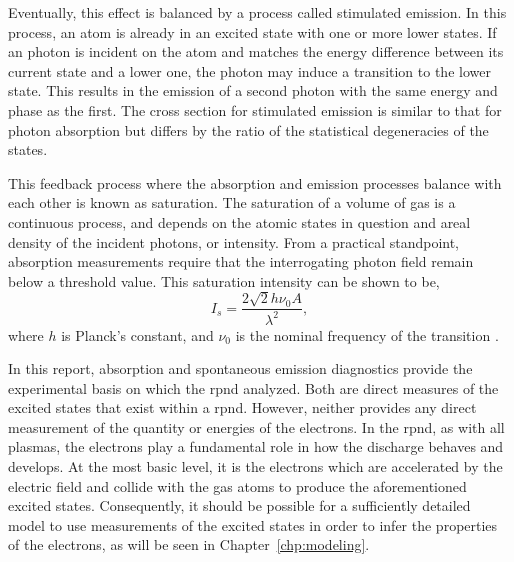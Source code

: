 Eventually, this effect is balanced by a process called stimulated emission. In
this process, an atom is already in an excited state with one or more lower
states. If an photon is incident on the atom and matches the energy difference
between its current state and a lower one, the photon may induce a transition to
the lower state. This results in the emission of a second photon with the same
energy and phase as the first. The cross section for stimulated emission is
similar to that for photon absorption but differs by the ratio of the
statistical degeneracies of the states.

This feedback process where the absorption and emission processes balance with
each other is known as saturation. The saturation of a volume of gas is a
continuous process, and depends on the atomic states in question and areal
density of the incident photons, or intensity. From a practical standpoint,
absorption measurements require that the interrogating photon field remain below
a threshold value. This saturation intensity can be shown \cite{Siegman1986} to
be,
\begin{equation}
  I_s = \frac{2\sqrt{2}h\nu_0A}{\lambda^2},
\end{equation}
where $h$ is Planck's constant, and $\nu_0$ is the nominal frequency of the
transition \cite{Siegman1986}.

In this report, absorption and spontaneous emission diagnostics provide the
experimental basis on which the \acs{rpnd} analyzed. Both are direct measures of
the excited states that exist within a \acs{rpnd}. However, neither provides any
direct measurement of the quantity or energies of the electrons. In the
\acs{rpnd}, as with all plasmas, the electrons play a fundamental role in how
the discharge behaves and develops. At the most basic level, it is the electrons
which are accelerated by the electric field and collide with the gas atoms to
produce the aforementioned excited states. Consequently, it should be possible
for a sufficiently detailed model to use measurements of the excited states in
order to infer the properties of the electrons, as will be seen in
Chapter~\ref{chp:modeling}.
